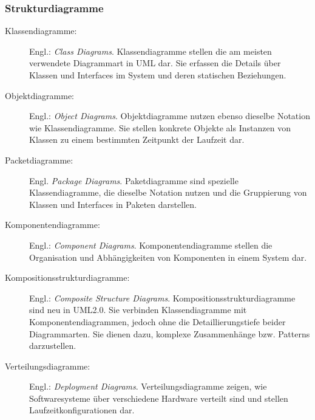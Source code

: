 \subsubsection{Strukturdiagramme}
\begin{description}
\item[Klassendiagramme:] Engl.: \emph{Class Diagrams}. Klassendiagramme stellen die am meisten verwendete Diagrammart in UML dar. Sie erfassen die Details über Klassen und Interfaces im System und deren statischen Beziehungen.
\item[Objektdiagramme:] Engl.: \emph{Object Diagrams}. Objektdiagramme nutzen ebenso dieselbe Notation wie Klassendiagramme. Sie stellen konkrete Objekte als Instanzen von Klassen zu einem bestimmten Zeitpunkt der Laufzeit dar.
\item[Packetdiagramme:] Engl. \emph{Package Diagrams}. Paketdiagramme sind spezielle Klassendiagramme, die dieselbe Notation nutzen und die Gruppierung von Klassen und Interfaces in Paketen darstellen.
\item[Komponentendiagramme:] Engl.: \emph{Component Diagrams}. Komponentendiagramme stellen die Organisation und Abhängigkeiten von Komponenten in einem System dar.
\item[Kompositionsstrukturdiagramme:] Engl.: \emph{Composite Structure Diagrams}. Kompositionsstrukturdiagramme sind neu in UML2.0. Sie verbinden Klassendiagramme mit Komponentendiagrammen, jedoch ohne die Detaillierungstiefe beider Diagrammarten. Sie dienen dazu, komplexe Zusammenhänge bzw. Patterns darzustellen.
\item[Verteilungsdiagramme:] Engl.: \emph{Deployment Diagrams}. Verteilungsdiagramme zeigen, wie Softwaresysteme über verschiedene Hardware verteilt sind und stellen Laufzeitkonfigurationen dar.
\end{description}

